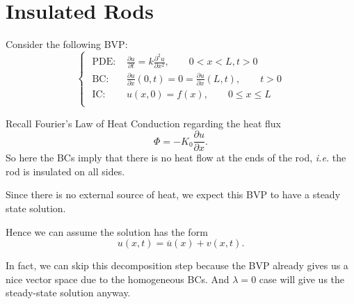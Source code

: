 \documentclass[class=article,crop=false]{standalone}
\begin{document}
\newpage
\section{Insulated Rods}

Consider the following BVP:
\begin{equation*}
\begin{cases}
	\text{ PDE: }& \frac{\partial u}{\partial t} = k \frac{\partial^2 u}{\partial { x}^2},\qquad  0<x<L,t>0 \\
	\text{ BC: } & \frac{\partial u}{\partial x}(0,t)=0= \frac{\partial u}{\partial x} (L,t), \qquad  t>0\\
	\text{ IC: } & u(x,0) = f(x), \qquad  0 \leq x \leq L\\ 
\end{cases}
\end{equation*}

Recall Fourier's Law of Heat Conduction regarding the heat flux
\[
\Phi=-K_0 \frac{\partial u}{\partial x} 
.\] 
So here the BCs imply that there is no heat flow at the ends of the rod, \emph{i.e.} the rod is insulated on all sides.

Since there is no external source of heat, we expect this BVP to have a steady state solution.

Hence we can assume the solution has the form
\[
	u(x,t) = \overline{u}(x) + v(x,t)
.\] 

In fact, we can skip this decomposition step because the BVP already gives us a nice vector space due to the homogeneous BCs. And $ \lambda =0$ case will give us the steady-state solution anyway.
\end{document}
